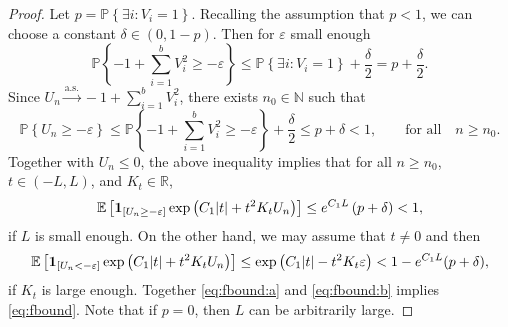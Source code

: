 \documentclass[11pt]{article}
\newcommand{\E}[1]{\mathbb{E} \left[#1\right]}
\newcommand{\ind}{{\bf 1}}
\def\R{\mathbb{R}}
\def\N{\mathbb{N}}
\newcommand\Prob[1]{{\mathbb{P}\left\{#1\right\}}}
\numberwithin{theorem}{section}
\theoremstyle{definition}
\newcommand{\inas}{\asto} %
\numberwithin{equation}{section}
\newcommand{\too}{\longrightarrow}
\newcommand\asto{\overset{\mathrm{a.s.}}{\too}}
\begin{document}
\begin{proof}
    Let \(p = \Prob{\exists i:V_i = 1}\).
    Recalling the assumption that \(p < 1\), we can choose a constant \(\delta \in (0, 1-p)\).
    Then for \(\varepsilon\) small enough
    \[
        \Prob{-1+\sum_{i=1}^{b}V_{i}^2 \ge -\varepsilon} 
        \le
        \Prob{\exists i: V_{i}=1} + \frac{\delta}{2} = p + \frac{\delta}{2}
        .
    \]
    Since \(U_{n} \inas -1 + \sum_{i=1}^{b} V_{i}^{2}\), there exists \(n_0 \in \N\) such that
    \[
        \Prob{U_{n} \ge -\varepsilon}
        \le 
        \Prob{-1+\sum_{i=1}^{b}V_{i}^2 \ge -\varepsilon} 
        + 
        \frac{\delta}{2}
        \le p+\delta
        <1
        ,
        \qquad
        \text{for all}
        \quad
        n \ge n_{0}
        .
    \]
    Together with \(U_{n} \le 0\), the above inequality implies that for all \(n \ge n_0\),
    \(t \in (-L, L)\), and \(K_{t} \in \R\),
    \begin{equation}
        \E{\ind_{[U_{n} \ge -\varepsilon]} \exp\left( C_1 |t| + t^{2}K_{t} U_{n} \right)}
        \le
        e^{C_{1}L} \left( p+\delta \right)
        < 1
        ,
        \label{eq:fbound:a}
    \end{equation}
    if \(L\) is small enough.
    On the other hand,
we may assume that $t\neq0$ and then 
    \begin{equation}
        \E{\ind_{[U_{n} < -\varepsilon]} \exp\left( C_{1}|t| + t^{2}K_{t} U_{n}
            \right)}
        \le 
        \exp\left( C_{1}|t|-t^{2}K_{t} \varepsilon \right)
        <
        1- e^{C_{1}L}(p+\delta),
        \label{eq:fbound:b}
    \end{equation}
    if \(K_{t}\) is large enough.
    Together \eqref{eq:fbound:a} and \eqref{eq:fbound:b} implies \eqref{eq:fbound}.
    Note that if \(p = 0\), then \(L\) can be arbitrarily large.
\end{proof}

\newcommand{\Ain}{A_{n}^{(i)}}
\newcommand{\Jin}{J_{n}^{(i)}}
\newcommand{\Jini}{J_{n_i}^{(i)}}
\end{document}
